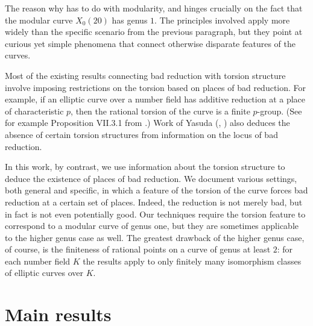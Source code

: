 \documentclass[12pt]{amsart}
\newcommand{\adam}[1]{{\textbf{Adam}: {\textcolor{blue}{#1}}}}
\begin{document}
The reason why has to do with modularity, and hinges crucially on the fact that the modular curve $X_0(20)$ has genus $1$.  The principles involved apply more widely than the specific scenario from the previous paragraph, but they point at curious yet simple phenomena that connect otherwise disparate features of the curves.

Most of the existing results connecting bad reduction with torsion structure involve imposing restrictions on the torsion based on places of bad reduction.  For example, if an elliptic curve over a number field has additive reduction at a place of characteristic $p$, then the rational torsion of the curve is a finite $p$-group.  (See for example Proposition VII.3.1 from \cite{Si}.)  Work of Yasuda (\cite{Ya1}, \cite{Ya2}) also deduces the absence of certain torsion structures from information on the locus of bad reduction.

In this work, by contrast, we use information about the torsion structure to deduce the existence of places of bad reduction.  We document various settings, both general and specific, in which a feature of the torsion of the curve forces bad reduction at a certain set of places.  Indeed, the reduction is not merely bad, but in fact is not even potentially good.  Our techniques require the torsion feature to correspond to a modular curve of genus one, but they are sometimes applicable to 
the higher genus case as well.  The greatest drawback of the higher genus case, of course, is the finiteness of rational points on a curve of genus at least $2$: for each number field $K$ the
results apply to only finitely many isomorphism classes of elliptic curves over $K$.

\section{Main results}

\end{document}
